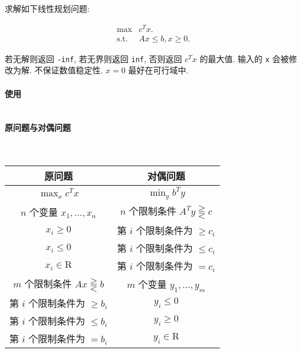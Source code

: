 求解如下线性规划问题:

\[
    \begin{array}{ll}
        \max          & c^T x.             \\
        \textrm{s.t.} & Ax \le b, x \ge 0.
    \end{array}
\]

若无解则返回 \verb|-inf|, 若无界则返回 \verb|inf|, 否则返回 \(c^T x\) 的最大值. 输入的 \verb|x| 会被修改为解. 不保证数值稳定性. \(x = 0\) 最好在可行域中.

\paragraph{使用}

\inputminted{cpp}{src/src/simplex_usage.txt}

\paragraph{原问题与对偶问题}~\\

\begin{tabular}{c|c}
    \hline
    原问题                               & 对偶问题                                \\
    \hline
    \(\max_x c^T x\)                     & \(\min_y b^T y\)                        \\
    \hline
    \(n\) 个变量 \(x_1,\dots,x_n\)       & \(n\) 个限制条件 \(A^T y\gtreqqless c\) \\
    \(x_i\geq 0\)                        & 第 \(i\) 个限制条件为 \(\geq c_i\)      \\
    \(x_i\leq 0\)                        & 第 \(i\) 个限制条件为 \(\leq c_i\)      \\
    \(x_i\in \mathrm{R}\)                & 第 \(i\) 个限制条件为 \(=c_i\)          \\
    \hline
    \(m\) 个限制条件 \(Ax\gtreqqless b\) & \(m\) 个变量 \(y_1,\dots,y_m\)          \\
    第 \(i\) 个限制条件为 \(\geq b_i\)   & \(y_i\leq 0\)                           \\
    第 \(i\) 个限制条件为 \(\leq b_i\)   & \(y_i\geq 0\)                           \\
    第 \(i\) 个限制条件为 \(=b_i\)       & \(y_i\in \mathrm{R}\)                   \\
    \hline
\end{tabular}

